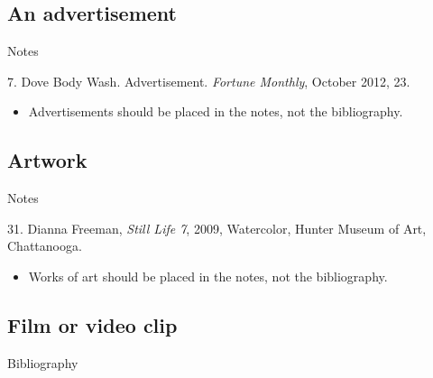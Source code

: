 \subsection{An advertisement}

\begin{center}{Notes}\end{center}

\begin{singlespace}
\noindent\hspace{1.2cm}7. Dove Body Wash. Advertisement. \emph{Fortune Monthly}, October
2012, 23.
\end{singlespace}

\begin{itemize}\item Advertisements should be placed in the notes, not the
bibliography.\end{itemize}

\subsection{Artwork}

\begin{center}{Notes}\end{center}

\begin{singlespace}
\noindent\hspace{1.2cm}31. Dianna Freeman, \emph{Still Life 7}, 2009, Watercolor, Hunter
Museum of Art, Chattanooga.

\end{singlespace}


\begin{itemize}\item Works of art should be placed in the notes, not the
bibliography.\end{itemize}

\subsection{Film or video clip}

\begin{center}{Bibliography}\end{center}

\begin{singlespace}
\noindent{}
\end{singlespace}

